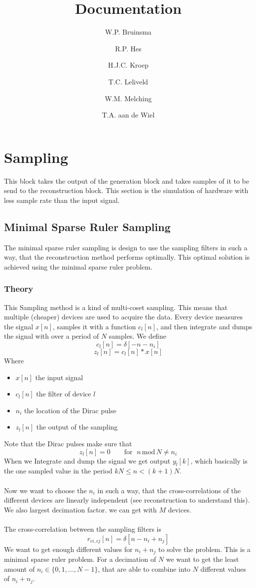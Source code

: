 \documentclass[report, oneside, a4paper, openany]{memoir}
\title{Documentation}
\author{W.P. Bruinsma \and R.P. Hes \and H.J.C. Kroep \and T.C. Leliveld \and W.M. Melching \and T.A. aan de Wiel}
\begin{document}
\chapter{Sampling}
This block takes the output of the generation block and takes samples of it to be send to the reconstruction block. 
This section is the simulation of hardware with less sample rate than the input signal.


\section{Minimal Sparse Ruler Sampling}
The minimal sparse ruler sampling is design to use the sampling filters in such a way, that the reconstruction method performs optimally. This optimal solution is achieved using the minimal sparse ruler problem.
\subsection{Theory}
This Sampling method is a kind of multi-coset sampling. This means that multiple (cheaper) devices are used to acquire the data. Every device measures the signal $x[n]$, samples it with a function $c_l[n]$, and then integrate and dumps the signal with over a period of $N$ samples. We define 
$$
c_l[n] = \delta[-n -n_i]
$$
$$
z_l[n] = c_l[n]\ast x[n] 
$$
Where
\begin{itemize}
\item $x[n]$ the input signal
\item $c_l[n]$ the filter of device $l$
\item $n_i$ the location of the Dirac pulse
\item $z_l[n]$ the output of the sampling
\end{itemize}
Note that the Dirac pulses make sure that
$$z_l[n]=0 \quad \quad \text{for }\;n\,\text{mod}\,N\neq n_i$$
When we Integrate and dump the signal we get output $y_l[k]$, which basically is the one sampled value in the period $kN\leq n<(k+1)N$.\\
\\
Now we want to choose the $n_i$ in such a way, that the cross-correlations of the different devices are linearly independent (see reconstruction to understand this). We also largest decimation factor. we can get with $M$ devices.\\
\\
The cross-correlation between the sampling filters is 
$$
r_{ci,cj}[n] = \delta [n-n_i+n_j]
$$
We want to get enough different values for $n_i+n_j$ to solve the problem. This is a minimal sparse ruler problem. For a decimation of $N$ we want to get the least amount of $n_i \in \{0,1,\dots,N-1\}$, that are able to combine into $N$ different values of $n_i+n_j$. 
\end{document}
